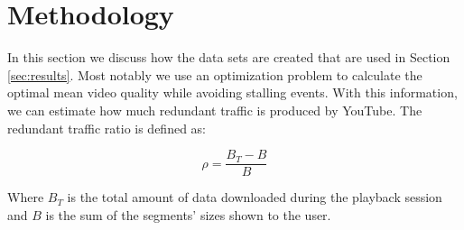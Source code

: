 
\section{Methodology}

\label{sec:sysmodel}

In this section we discuss how the data sets are created that are used in Section \ref{sec:results}. Most notably we use an optimization problem to calculate the optimal mean video quality while avoiding stalling events. With this information, we can estimate how much redundant traffic is produced by YouTube. The redundant traffic ratio is defined as:

\begin{equation}
	\rho = \frac{B_T-B}{B}
\end{equation}

Where $B_T$ is the total amount of data downloaded during the playback session and $B$ is the sum of the segments' sizes shown to the user.




